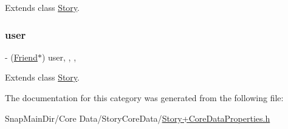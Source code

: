 Extends class \hyperlink{interface_story_a4616dbf24fe3c6c6f5482aea92cedd57}{Story}.

\hypertarget{category_story_07_core_data_properties_08_a121feaf5c67f45ee0541af06a20407af}{}\label{category_story_07_core_data_properties_08_a121feaf5c67f45ee0541af06a20407af} 
\subsubsection{\texorpdfstring{user}{user}}
{\footnotesize\ttfamily -\/ (\hyperlink{interface_friend}{Friend}$\ast$) user\hspace{0.3cm}{\ttfamily [read]}, {\ttfamily [write]}, {\ttfamily [nonatomic]}, {\ttfamily [retain]}}



Extends class \hyperlink{interface_story_a121feaf5c67f45ee0541af06a20407af}{Story}.



The documentation for this category was generated from the following file\+:\begin{DoxyCompactItemize}
\item 
Snap\+Main\+Dir/\+Core Data/\+Story\+Core\+Data/\hyperlink{_story_09_core_data_properties_8h}{Story+\+Core\+Data\+Properties.\+h}\end{DoxyCompactItemize}
